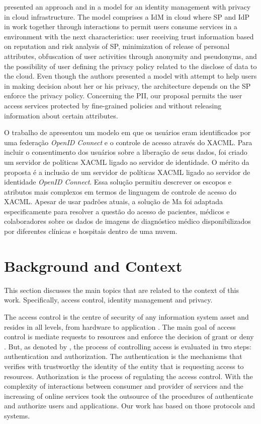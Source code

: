 \documentclass{doublecol-new}
\begin{document}
\cite{werner2015approach} presented an approach and in \cite{werner2016model} a model for an identity management with privacy in cloud infrastructure. The model comprises a IdM in cloud where SP and IdP in work together through interactions to permit users consume services in a environment with the next characteristics: user receiving trust information based on reputation and risk analysis of SP, minimization of release of personal attributes, obfuscation of user activities through anonymity and pseudonyms, and the possibility of user defining the privacy policy related to the disclose of data to the cloud. Even though the authors presented a model with attempt to help users in making decision about her or his privacy, the architecture depends on the SP enforce the privacy policy. Concerning the PII, our proposal permits the user access services protected by fine-grained policies and without releasing information about certain attributes.

O trabalho de \cite{ma2015cloud} apresentou um modelo em que os usuários eram identificados por uma federação \textit{OpenID Connect} e o controle de acesso através do XACML. Para incluir o consentimento dos usuários sobre a liberação de seus dados, foi criado um servidor de políticas XACML ligado ao servidor de identidade. O mérito da proposta é a inclusão de um servidor de políticas XACML ligado ao servidor de identidade \textit{OpenID Connect}. Essa solução permitiu descrever os escopos e atributos mais complexos em termos de linguagem de controle de acesso do XACML. Apesar de usar padrões atuais, a solução de Ma foi adaptada especificamente para resolver a questão do acesso de pacientes, médicos e colaboradores sobre os dados de imagens de diagnóstico médico disponibilizados por diferentes clínicas e hospitais dentro de uma nuvem.



\section{Background and Context}
This section discusses the main topics that are related to the context of this work. Specifically, access control, identity management and privacy.

The access control is the centre of security of any information system asset and resides in all levels, from hardware to application \citep{anderson2008security}. The main goal of access control is mediate requests to resources and enforce the decision of grant or deny \citep{samarati2001access}. But, as denoted by \cite{gollmann2011compsecurity}, the process of controlling access is evaluated in two steps: authentication and authorization. The authentication is the mechanisms that verifies with trustworthy the identity of the entity that is requesting access to resources. Authorization is the process of regulating the access control. With the complexity of interactions between consumer and provider of services and the increasing of online services took the outsource of the procedures of authenticate and authorize users and applications. Our work has based on those protocols and systems.
\end{document}
